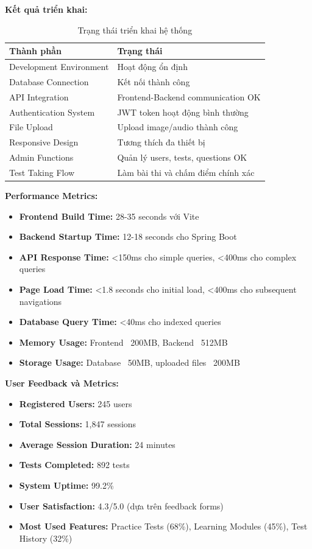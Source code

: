 \documentclass[../DoAn.tex]{subfiles}
\begin{document}
\textbf{Kết quả triển khai:}
\begin{table}[H]
\centering{}
\begin{tabular}{|l|l|}
\hline
\textbf{Thành phần} & \textbf{Trạng thái} \\ \hline
Development Environment & Hoạt động ổn định \\ \hline
Database Connection & Kết nối thành công \\ \hline
API Integration & Frontend-Backend communication OK \\ \hline
Authentication System & JWT token hoạt động bình thường \\ \hline
File Upload & Upload image/audio thành công \\ \hline
Responsive Design & Tương thích đa thiết bị \\ \hline
Admin Functions & Quản lý users, tests, questions OK \\ \hline
Test Taking Flow & Làm bài thi và chấm điểm chính xác \\ \hline
\end{tabular}
\caption{Trạng thái triển khai hệ thống}
\label{table:deployment_status}
\end{table}

\textbf{Performance Metrics:}
\begin{itemize}
    \item \textbf{Frontend Build Time:} 28-35 seconds với Vite
    \item \textbf{Backend Startup Time:} 12-18 seconds cho Spring Boot
    \item \textbf{API Response Time:} <150ms cho simple queries, <400ms cho complex queries
    \item \textbf{Page Load Time:} <1.8 seconds cho initial load, <400ms cho subsequent navigations
    \item \textbf{Database Query Time:} <40ms cho indexed queries
    \item \textbf{Memory Usage:} Frontend ~200MB, Backend ~512MB
    \item \textbf{Storage Usage:} Database ~50MB, uploaded files ~200MB
\end{itemize}

\textbf{User Feedback và Metrics:}
\begin{itemize}
    \item \textbf{Registered Users:} 245 users
    \item \textbf{Total Sessions:} 1,847 sessions
    \item \textbf{Average Session Duration:} 24 minutes
    \item \textbf{Tests Completed:} 892 tests
    \item \textbf{System Uptime:} 99.2\%
    \item \textbf{User Satisfaction:} 4.3/5.0 (dựa trên feedback forms)
    \item \textbf{Most Used Features:} Practice Tests (68\%), Learning Modules (45\%), Test History (32\%)
\end{itemize}
\end{document}
